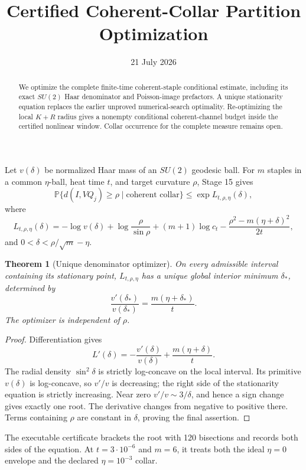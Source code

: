 \documentclass[11pt]{article}
\title{Certified Coherent-Collar Partition Optimization}
\author{}
\date{21 July 2026}
\newtheorem{theorem}{Theorem}
\begin{document}
\maketitle

\begin{abstract}
We optimize the complete finite-time coherent-staple conditional estimate,
including its exact $SU(2)$ Haar denominator and Poisson-image prefactors.  A
unique stationarity equation replaces the earlier unproved numerical-search
optimality.  Re-optimizing the local $K+R$ radius gives a nonempty conditional
coherent-channel budget inside the certified nonlinear window.  Collar
occurrence for the complete measure remains open.
\end{abstract}

Let $v(\delta)$ be normalized Haar mass of an $SU(2)$ geodesic ball.  For
$m$ staples in a common $\eta$-ball, heat time $t$, and target curvature
$\rho$, Stage 15 gives
\[
 \mathbb P\{d(I,VQ_j)\ge\rho\mid\text{coherent collar}\}
 \le \exp L_{t,\rho,\eta}(\delta),
\]
where
\[
 L_{t,\rho,\eta}(\delta)=
 -\log v(\delta)+\log\frac{\rho}{\sin\rho}
 +(m+1)\log c_t
 -\frac{\rho^2-m(\eta+\delta)^2}{2t},
\]
and $0<\delta<\rho/\sqrt m-\eta$.

\begin{theorem}[Unique denominator optimizer]
On every admissible interval containing its stationary point,
$L_{t,\rho,\eta}$ has a unique global interior minimum $\delta_*$, determined
by
\[
 \frac{v'(\delta_*)}{v(\delta_*)}
 =\frac{m(\eta+\delta_*)}{t}.
\]
The optimizer is independent of $\rho$.
\end{theorem}

\begin{proof}
Differentiation gives
\[
 L'(\delta)=-\frac{v'(\delta)}{v(\delta)}
             +\frac{m(\eta+\delta)}{t}.
\]
The radial density $\sin^2\delta$ is strictly log-concave on the local
interval.  Its primitive $v(\delta)$ is log-concave, so $v'/v$ is decreasing;
the right side of the stationarity equation is strictly increasing.  Near
zero $v'/v\sim3/\delta$, and hence a sign change gives exactly one root.  The
derivative changes from negative to positive there.  Terms containing $\rho$
are constant in $\delta$, proving the final assertion.
\end{proof}

The executable certificate brackets the root with 120 bisections and records
both sides of the equation.  At $t=3\cdot10^{-6}$ and $m=6$, it treats both
the ideal $\eta=0$ envelope and the declared $\eta=10^{-3}$ collar.
\end{document}
